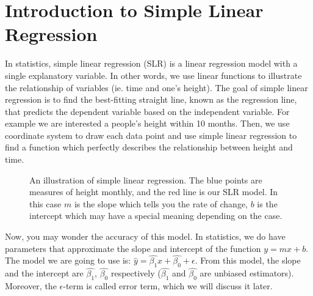 \setcounter{chapter}{14}
\chapter{Introduction to Simple Linear Regression}

In statistics, simple linear regression (SLR) is a linear regression model with a single explanatory variable. In other words, we use linear functions to illustrate the relationship of variables (ie. time and one's height). The goal of simple linear regression is to find the best-fitting straight line, known as the regression line, that predicts the dependent variable based on the independent variable. For example we are interested a people's height within 10 months. Then, we use coordinate system to draw each data point and use simple linear regression to find a function which perfectly describes the relationship between height and time.

\begin{figure}[h]
\centering
{}
\caption{An illustration of simple linear regression. The blue points are measures of height monthly, and the red line is our SLR model. In this case $m$ is the slope which tells you the rate of change, $b$ is the intercept which may have a special meaning depending on the case.}
\end{figure}

Now, you may wonder the accuracy of this model. In statistics, we do have parameters that approximate the slope and intercept of the function $y = mx + b$. The model we are going to use is: $\hat{y} = \hat{\beta_1}x + \hat{\beta_0} + \epsilon$. From this model, the slope and the intercept are $\hat{\beta_1}$, $\hat{\beta_{0}}$ respectively ($\hat{\beta_1}$ and $\hat{\beta_{0}}$ are unbiased estimators). Moreover, the $\epsilon$-term is called error term, which we will discuss it later.

